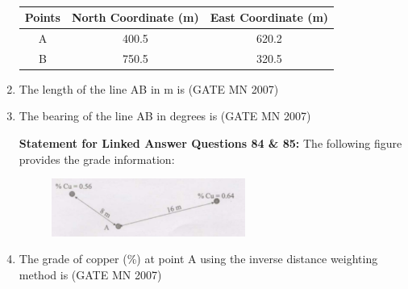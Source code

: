 \documentclass[journal]{IEEEtran}
\begin{document}
\begin{enumerate}
\begin{table}[H]
    \centering\normalsize
\begin{tabular}{|c|c|c|}
\hline
Points & North Coordinate (m) & East Coordinate (m) \\
\hline
A & 400.5 & 620.2 \\
\hline
B & 750.5 & 320.5 \\
\hline
\end{tabular}
    \caption*{}
	\label{tab:Q82&83}
\end{table}
\item The length of the line AB in m is 
	\hfill (GATE MN 2007)
\begin{enumerate}
\end{enumerate}

\item The bearing of the line AB in degrees is  
	\hfill (GATE MN 2007)
\begin{enumerate}
\end{enumerate}
\textbf{Statement for Linked Answer Questions 84 \& 85:} The following figure provides the grade information:

\begin{figure}[H]
    \centering                                  
\includegraphics[width=0.6\textwidth]{Screenshot_2025_0812_201406.png}                 
\caption*{}
	\label{fig:Q84&85}
\end{figure}

\item The grade of copper (\%) at point A using the inverse distance weighting method is  
	\hfill (GATE MN 2007)
\begin{enumerate}
\end{enumerate}


\end{enumerate}
\end{document}
